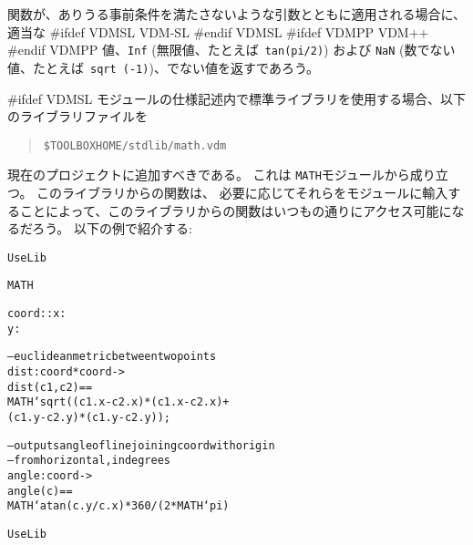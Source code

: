 \documentclass[\pformat,12pt]{jarticle}
\newcommand{\vdmslpp}[2]{%
#ifdef VDMSL
#1
#endif VDMSL
#ifdef VDMPP
#2
#endif VDMPP
}
\newcommand{\vdmsl}{VDM-SL}
\newcommand{\vdmpp}{VDM++}
\begin{document}
関数が、ありうる事前条件を満たさないような引数とともに適用される場合に、適当な\vdmslpp{\vdmsl}{\vdmpp} 値、{\tt Inf} (無限値、たとえば\ {\tt  tan(pi/2)}) および {\tt NaN} (数でない値、たとえば\ {\tt sqrt (-1)})、でない値を返すであろう。


#ifdef VDMSL
% 
% 
% 
% 
% 
% 
% 
% 
モジュールの仕様記述内で標準ライブラリを使用する場合、以下のライブラリファイルを
\begin{quote}
\verb+$TOOLBOXHOME/stdlib/math.vdm+
\end{quote}
現在のプロジェクトに追加すべきである。
これは \texttt{MATH}モジュールから成り立つ。
このライブラリからの関数は、
必要に応じてそれらをモジュールに輸入することによって、このライブラリからの関数はいつもの通りにアクセス可能になるだろう。
以下の例で紹介する:

\begin{alltt}
 UseLib

     MATH 



  coord :: x : 
           y : 


  -- euclidean metric between two points
  dist : coord * coord -> 
  dist (c1,c2) ==
    MATH`sqrt((c1.x - c2.x) * (c1.x - c2.x) +
              (c1.y - c2.y) * (c1.y - c2.y));

  -- outputs angle of line joining coord with origin
  -- from horizontal, in degrees
  angle : coord -> 
  angle (c) ==
    MATH`atan (c.y / c.x) * 360 / ( 2 * MATH`pi)

 UseLib
\end{alltt}
\end{document}
